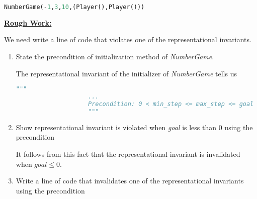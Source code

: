 \documentclass[12pt]{article}
\begin{document}
\begin{enumerate}[1.]
\begin{itemize}
        \bigskip

        \begin{lstlisting}[language=Python]
        NumberGame(-1,3,10,(Player(),Player()))
        \end{lstlisting}

        \bigskip

        \begin{mdframed}
            \underline{\textbf{Rough Work:}}

            \bigskip

            We need write a line of code that violates one of the representational invariants.

            \bigskip

            \begin{enumerate}[1.]
                \item State the precondition of initialization method of \textit{NumberGame}.

                \bigskip

                \begin{mdframed}

                    The representational invariant of the initializer of
                    \textit{NumberGame} tells us

                    \begin{lstlisting}[language=Python]
                    """
                    ...
                    Precondition: 0 < min_step <= max_step <= goal
                    """
                    \end{lstlisting}

                \end{mdframed}

                \bigskip

                \item Show representational invariant is violated when \textit{goal}
                is less than 0 using the precondition

                \begin{mdframed}
                It follows from this fact that the representational invariant is
                invalidated when $goal \leq 0$.

                \end{mdframed}

                \item Write a line of code that invalidates one of the representational invariants using the precondition


\end{enumerate}
\end{mdframed}
\end{itemize}
\end{enumerate}
\end{document}
